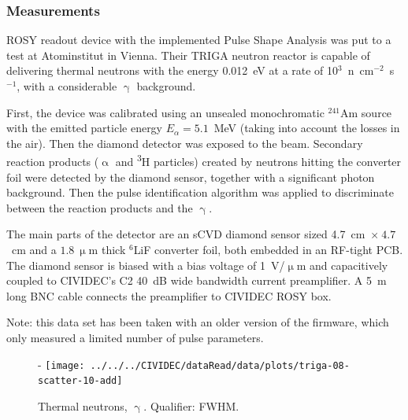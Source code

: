 \subsubsection{Measurements}
ROSY readout device with the implemented Pulse Shape Analysis was put to a test at Atominstitut in Vienna. Their TRIGA neutron reactor is capable of delivering thermal neutrons with the energy 0.012~eV at a rate of 10$^3$~n~cm$^{-2}$~s$^{-1}$, with a considerable $\upgamma$ background. 

First, the device was calibrated using an unsealed monochromatic $^{241}$Am source with the emitted particle energy $E_\alpha=5.1$~MeV (taking into account the losses in the air). Then the diamond detector was exposed to the beam. Secondary reaction products ($\upalpha$ and \textsuperscript{3}H particles) created by neutrons hitting the converter foil were detected by the diamond sensor, together with a significant photon background. Then the pulse identification algorithm was applied to discriminate between the reaction products and the $\upgamma$.

The main parts of the detector are an sCVD diamond sensor sized 4.7~cm~$\times~4.7$~cm and a $1.8~\upmu$m thick $^6$LiF converter foil, both embedded in an RF-tight PCB. The diamond sensor is biased with a bias voltage of 1~V/$\upmu$m  and capacitively coupled to CIVIDEC's C2 40~dB wide bandwidth current preamplifier. A 5~m long BNC cable connects the preamplifier to CIVIDEC ROSY box. 


Note: this data set has been taken with an older version of the firmware, which only measured a limited number of pulse parameters.

\clearpage
\begin{figure}[]
\centering-
\texttt{[image: ../../../CIVIDEC/dataRead/data/plots/triga-08-scatter-10-add]}
\caption{Thermal neutrons, $\upgamma$. Qualifier: FWHM.}
\label{fig:scattertriga1}
\end{figure}

